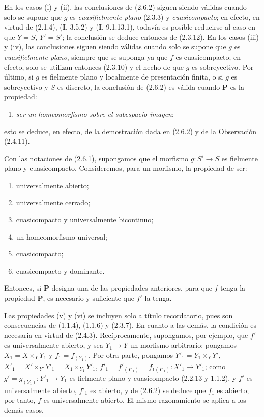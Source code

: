 \begin{remark}[2.6.3]
\label{IV.2.6.3-fr}
En los casos (i) y (ii), las conclusiones de (2.6.2) siguen siendo válidas
cuando solo se supone que $g$ es \emph{cuasifielmente plano} (2.3.3) y \emph{cuasicompacto};
en efecto, en virtud de (2.1.4), (\textbf I, 3.5.2) y (\textbf I, 9.1.13.1), todavía es posible
reducirse al caso en que $Y=S$, $Y'=S'$; la conclusión se deduce entonces de
(2.3.12). En los casos (iii) y (iv), las conclusiones siguen siendo válidas
cuando solo se supone que $g$ es \emph{cuasifielmente plano}, siempre que se suponga
ya que $f$ es cuasicompacto; en efecto, solo se utilizan entonces (2.3.10) y el
hecho de que $g$ es sobreyectivo. Por último, si $g$ es fielmente plano y
localmente de presentación finita, o si $g$ es sobreyectivo y $S$ es discreto,
la conclusión de (2.6.2) es válida cuando $\boldsymbol{P}$ es la propiedad:
\begin{enumerate}
\item[(iii \emph{bis})] \emph{ser un homeomorfismo sobre el subespacio imagen};
\end{enumerate}
esto se deduce, en efecto, de la demostración dada en (2.6.2) y de la
Observación (2.4.11).
\end{remark}

\begin{corollary}[2.6.4]
\label{IV.2.6.4-fr}
Con las notaciones de \textup{(2.6.1)}, supongamos que el morfismo $g:S'\to S$ es
fielmente plano y cuasicompacto. Consideremos, para un morfismo, la propiedad
de ser:
\begin{enumerate}
\item[\textup{(i)}] universalmente abierto;
\item[\textup{(ii)}] universalmente cerrado;
\item[\textup{(iii)}] cuasicompacto y universalmente bicontinuo;
\item[\textup{(iv)}] un homeomorfismo universal;
\item[\textup{(v)}] cuasicompacto;
\item[\textup{(vi)}] cuasicompacto y dominante.
\end{enumerate}
Entonces, si $\boldsymbol{P}$ designa una de las propiedades anteriores, para que $f$ tenga
la propiedad $\boldsymbol{P}$, es necesario y suficiente que $f'$ la tenga.
\end{corollary}

Las propiedades (v) y (vi) se incluyen solo a título recordatorio, pues son
consecuencias de (1.1.4), (1.1.6) y (2.3.7). En cuanto a las demás, la condición
es necesaria en virtud de (2.4.3). Recíprocamente, supongamos, por ejemplo, que
$f'$ es universalmente abierto, y sea $Y_1\to Y$ un morfismo arbitrario;
pongamos $X_1=X\times_Y Y_1$ y $f_1=f_{(Y_1)}$. Por otra parte, pongamos $Y'_1=Y_1\times_Y Y'$, $X'_1=X'\times_{Y'}Y'_1=X_1\times_{Y_1}Y'_1$, $f'_1=f'_{(Y'_1)}=f_{1(Y'_1)}:X'_1\to Y'_1$;
como $g'=g_{(Y_1)}:Y'_1\to Y_1$ es fielmente plano y cuasicompacto
(2.2.13 y 1.1.2), y $f'$ es universalmente abierto, $f'_1$ es abierto, y de
(2.6.2) se deduce que $f_1$ es abierto; por tanto, $f$ es universalmente
abierto. El mismo razonamiento se aplica a los demás casos.

